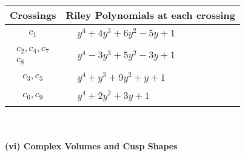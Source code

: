 \documentclass[1p]{elsarticle_modified}
\theoremstyle{definition}
\begin{document}
\begin{tabular}{m{50pt}|m{274pt}}
Crossings & \hspace{64pt}Riley Polynomials at each crossing \\
\hline $$\begin{aligned}c_{1}\end{aligned}$$&$\begin{aligned}
&y^4+4 y^3+6 y^2-5 y+1
\end{aligned}$\\
\hline $$\begin{aligned}c_{2},c_{4},c_{7}\\c_{8}\end{aligned}$$&$\begin{aligned}
&y^4-3 y^3+5 y^2-3 y+1
\end{aligned}$\\
\hline $$\begin{aligned}c_{3},c_{5}\end{aligned}$$&$\begin{aligned}
&y^4+y^3+9 y^2+y+1
\end{aligned}$\\
\hline $$\begin{aligned}c_{6},c_{9}\end{aligned}$$&$\begin{aligned}
&y^4+2 y^2+3 y+1
\end{aligned}$\\
\hline
\end{tabular}\\~\\
\newpage\flushleft \textbf{(vi) Complex Volumes and Cusp Shapes}
\end{document}
